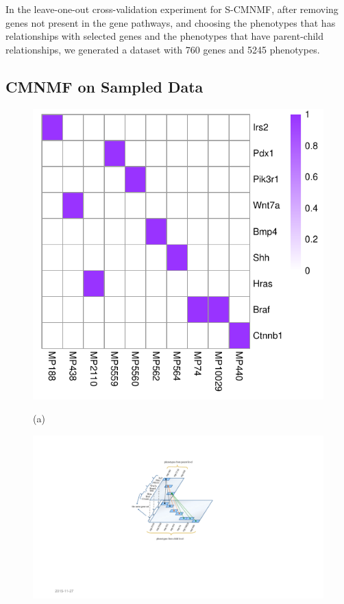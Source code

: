 \documentclass{bmcart}
\begin{document}
In the leave-one-out cross-validation experiment for S-CMNMF, after removing genes not present in the gene pathways, and choosing the phenotypes that has relationships with selected genes and the phenotypes that have parent-child relationships, we generated a dataset with 760 genes and 5245 phenotypes.
\subsection*{\textbf{CMNMF on Sampled Data}}
\begin{figure}[!h]
  \centering
  \begin{minipage}[b]{.40\linewidth}
   \includegraphics[width=\linewidth]{DrawPictures/v_4.pdf}
    \centerline{(a)}
  \end{minipage}
   \begin{minipage}[b]{.45\linewidth}
   \includegraphics[width=\linewidth]{DrawPictures/Hierarchica.pdf}

\end{minipage}
\end{figure}
\end{document}
